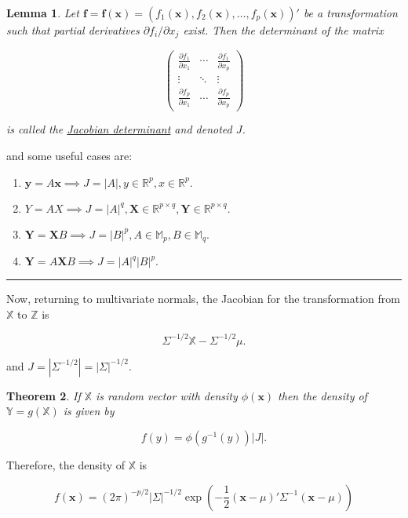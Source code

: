 \documentclass[twoside]{article}
\newcounter{lecnum}
\newtheorem{theorem}{Theorem}[lecnum]
\newtheorem{lemma}[theorem]{Lemma}
\begin{document}
\begin{lemma}
	Let $\mathbf{f}=\mathbf{f}(\mathbf{x})=(f_1(\mathbf{x}),f_2(\mathbf{x}),\dots,f_p(\mathbf{x}))'$ be a transformation such that partial derivatives $\partial f_i/\partial x_j$ exist. Then the determinant of the matrix
	
	$$\begin{pmatrix}
		\frac{\partial f_1}{\partial x_1} & \cdots & 		\frac{\partial f_1}{\partial x_p}\\
		\vdots & \ddots & \vdots\\
				\frac{\partial f_p}{\partial x_1} & \cdots & 		\frac{\partial f_p}{\partial x_p}
	\end{pmatrix}$$
	
is called the \underline{Jacobian determinant} and denoted $J$.
\end{lemma}

and some useful cases are:

\begin{enumerate}
	\item $\mathbf{y}=A\mathbf{x}\implies J=|A|, y\in\mathbb{R}^p, x\in\mathbb{R}^p.$
	\item $Y=AX\implies J=|A|^q, \mathbf{X}\in\mathbb{R}^{p\times q}, \mathbf{Y}\in\mathbb{R}^{p\times q}.$
	\item $\mathbf{Y}=\mathbf{X}B\implies J=|B|^p, A\in\mathbb{M}_p, B\in\mathbb{M}_q.$
	\item $\mathbf{Y}=A\mathbf{X}B\implies J=|A|^q|B|^p.$
\end{enumerate}

\noindent\rule{\textwidth}{1pt}

Now, returning to multivariate normals, the Jacobian for the transformation from $\mathbb{X}$ to $\mathbb{Z}$ is

$$\Sigma^{-1/2}\mathbb{X}-\Sigma^{-1/2}\mu.$$

and $J=|\Sigma^{-1/2}|=|\Sigma|^{-1/2}.$

\begin{theorem}
	If $\mathbb{X}$ is random vector with density $\phi(\mathbf{x})$ then  the density of $\mathbb{Y}=g(\mathbb{X})$ is given by
	
	$$f(y)=\phi(g^{-1}(y))|J|.$$
\end{theorem}

Therefore, the density of $\mathbb{X}$ is

\begin{equation}
	f(\mathbf{x})=(2\pi)^{-p/2}|\Sigma|^{-1/2}\exp\left(-\frac12(\mathbf{x}-\mu)'\Sigma^{-1}(\mathbf{x}-\mu)\right)
\end{equation}
\end{document}
